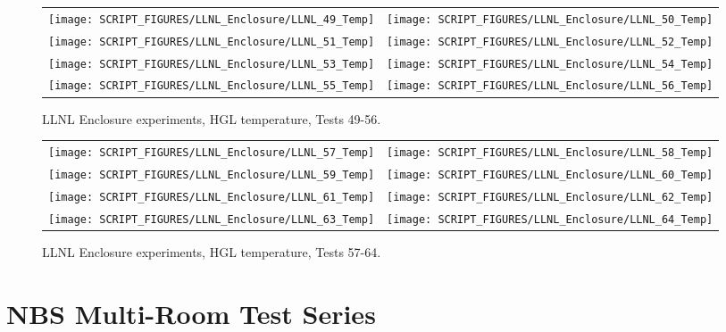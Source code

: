 \begin{figure}[p]
\begin{tabular*}{\textwidth}{l@{\extracolsep{\fill}}r}
\texttt{[image: SCRIPT\_FIGURES/LLNL\_Enclosure/LLNL\_49\_Temp]} &
\texttt{[image: SCRIPT\_FIGURES/LLNL\_Enclosure/LLNL\_50\_Temp]} \\
\texttt{[image: SCRIPT\_FIGURES/LLNL\_Enclosure/LLNL\_51\_Temp]} &
\texttt{[image: SCRIPT\_FIGURES/LLNL\_Enclosure/LLNL\_52\_Temp]} \\
\texttt{[image: SCRIPT\_FIGURES/LLNL\_Enclosure/LLNL\_53\_Temp]} &
\texttt{[image: SCRIPT\_FIGURES/LLNL\_Enclosure/LLNL\_54\_Temp]} \\
\texttt{[image: SCRIPT\_FIGURES/LLNL\_Enclosure/LLNL\_55\_Temp]} &
\texttt{[image: SCRIPT\_FIGURES/LLNL\_Enclosure/LLNL\_56\_Temp]}
\end{tabular*}
\caption[LLNL Enclosure experiments, HGL temperature, Tests 49-56]
{LLNL Enclosure experiments, HGL temperature, Tests 49-56.}
\label{LLNL_Enclosure_Temp_7}
\end{figure}

\begin{figure}[p]
\begin{tabular*}{\textwidth}{l@{\extracolsep{\fill}}r}
\texttt{[image: SCRIPT\_FIGURES/LLNL\_Enclosure/LLNL\_57\_Temp]} &
\texttt{[image: SCRIPT\_FIGURES/LLNL\_Enclosure/LLNL\_58\_Temp]} \\
\texttt{[image: SCRIPT\_FIGURES/LLNL\_Enclosure/LLNL\_59\_Temp]} &
\texttt{[image: SCRIPT\_FIGURES/LLNL\_Enclosure/LLNL\_60\_Temp]} \\
\texttt{[image: SCRIPT\_FIGURES/LLNL\_Enclosure/LLNL\_61\_Temp]} &
\texttt{[image: SCRIPT\_FIGURES/LLNL\_Enclosure/LLNL\_62\_Temp]} \\
\texttt{[image: SCRIPT\_FIGURES/LLNL\_Enclosure/LLNL\_63\_Temp]} &
\texttt{[image: SCRIPT\_FIGURES/LLNL\_Enclosure/LLNL\_64\_Temp]}
\end{tabular*}
\caption[LLNL Enclosure experiments, HGL temperature, Tests 57-64]
{LLNL Enclosure experiments, HGL temperature, Tests 57-64.}
\label{LLNL_Enclosure_Temp_8}
\end{figure}

\clearpage


\section{NBS Multi-Room Test Series}

